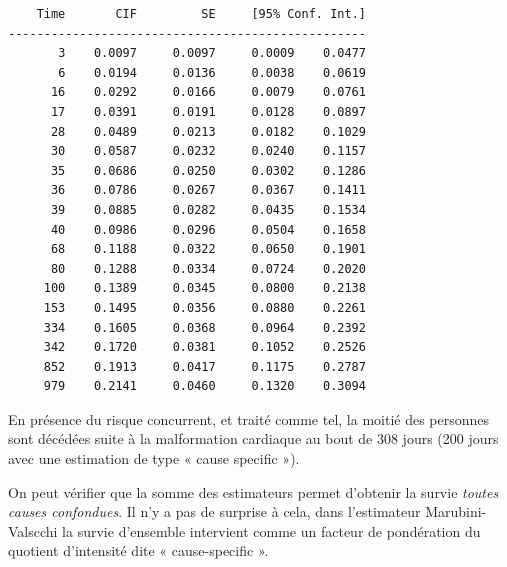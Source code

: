 \documentclass[
  12pt,
  letterpaper,
  DIV=11,
  numbers=noendperiod,
  onepage,
  openany]{scrreprt}
\begin{document}
\begin{verbatim}
    Time       CIF         SE     [95% Conf. Int.]
--------------------------------------------------
       3    0.0097     0.0097     0.0009    0.0477
       6    0.0194     0.0136     0.0038    0.0619
      16    0.0292     0.0166     0.0079    0.0761
      17    0.0391     0.0191     0.0128    0.0897
      28    0.0489     0.0213     0.0182    0.1029
      30    0.0587     0.0232     0.0240    0.1157
      35    0.0686     0.0250     0.0302    0.1286
      36    0.0786     0.0267     0.0367    0.1411
      39    0.0885     0.0282     0.0435    0.1534
      40    0.0986     0.0296     0.0504    0.1658
      68    0.1188     0.0322     0.0650    0.1901
      80    0.1288     0.0334     0.0724    0.2020
     100    0.1389     0.0345     0.0800    0.2138
     153    0.1495     0.0356     0.0880    0.2261
     334    0.1605     0.0368     0.0964    0.2392
     342    0.1720     0.0381     0.1052    0.2526
     852    0.1913     0.0417     0.1175    0.2787
     979    0.2141     0.0460     0.1320    0.3094
\end{verbatim}

En présence du risque concurrent, et traité comme tel, la moitié des
personnes sont décédées suite à la malformation cardiaque au bout de 308
jours (200 jours avec une estimation de type « cause specific »).

On peut vérifier que la somme des estimateurs permet d'obtenir la survie
\emph{toutes causes confondues}. Il n'y a pas de surprise à cela, dans
l'estimateur Marubini-Valscchi la survie d'ensemble intervient comme un
facteur de pondération du quotient d'intensité dite « cause-specific ».
\end{document}
